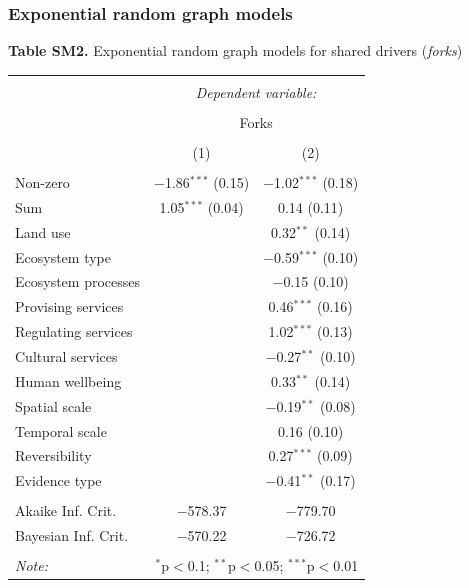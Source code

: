 \documentclass[9pt,]{article}
\begin{document}
\endgroup 

\subsubsection{Exponential random graph
models}\label{exponential-random-graph-models}

\textbf{Table SM2.} Exponential random graph models for shared drivers
(\textit{forks}) \begingroup  \small 

\begin{tabular}{@{\extracolsep{5pt}}lcc} 
\\[-1.8ex]\hline 
\hline \\[-1.8ex] 
 & \multicolumn{2}{c}{\textit{Dependent variable:}} \\ 
\cline{2-3} 
\\[-1.8ex] & \multicolumn{2}{c}{Forks} \\ 
\\[-1.8ex] & (1) & (2)\\ 
\hline \\[-1.8ex] 
 Non-zero & $-$1.86$^{***}$ (0.15) & $-$1.02$^{***}$ (0.18) \\ 
  Sum & 1.05$^{***}$ (0.04) & 0.14 (0.11) \\ 
  Land use &  & 0.32$^{**}$ (0.14) \\ 
  Ecosystem type &  & $-$0.59$^{***}$ (0.10) \\ 
  Ecosystem processes &  & $-$0.15 (0.10) \\ 
  Provising services &  & 0.46$^{***}$ (0.16) \\ 
  Regulating services &  & 1.02$^{***}$ (0.13) \\ 
  Cultural services &  & $-$0.27$^{**}$ (0.10) \\ 
  Human wellbeing &  & 0.33$^{**}$ (0.14) \\ 
  Spatial scale &  & $-$0.19$^{**}$ (0.08) \\ 
  Temporal scale &  & 0.16 (0.10) \\ 
  Reversibility &  & 0.27$^{***}$ (0.09) \\ 
  Evidence type &  & $-$0.41$^{**}$ (0.17) \\ 
 \hline \\[-1.8ex] 
Akaike Inf. Crit. & $-$578.37 & $-$779.70 \\ 
Bayesian Inf. Crit. & $-$570.22 & $-$726.72 \\ 
\hline 
\hline \\[-1.8ex] 
\textit{Note:}  & \multicolumn{2}{r}{$^{*}$p$<$0.1; $^{**}$p$<$0.05; $^{***}$p$<$0.01} \\ 
\end{tabular}
\end{document}
